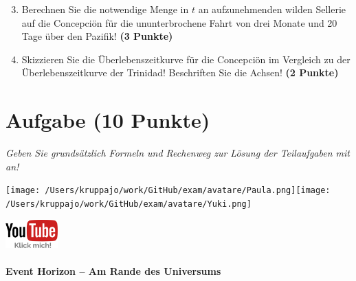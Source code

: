 \documentclass[a4paper, 9pt]{scrartcl}\usepackage[]{graphicx}\usepackage[]{xcolor}
\begin{document}
\begin{enumerate}
  \setcounter{enumi}{2}
\item Berechnen Sie die notwendige Menge in $t$ an aufzunehmenden wilden Sellerie auf die Concepciön für die ununterbrochene Fahrt von drei Monate und 20 Tage über den Pazifik! \textbf{(3 Punkte)}
\item Skizzieren Sie die Überlebenszeitkurve für die Concepciön im Vergleich zu der Überlebenszeitkurve der Trinidad! Beschriften Sie die Achsen! \textbf{(2 Punkte)}
\end{enumerate}

 
\clearpage

\section{Aufgabe \hfill (10 Punkte)}

\textit{Geben Sie grundsätzlich Formeln und Rechenweg zur Lösung der Teilaufgaben mit an!} \\[1Ex]
 

 
\begin{minipage}[t]{0.5\textwidth}
\texttt{[image: /Users/kruppajo/work/GitHub/exam/avatare/Paula.png]}\hspace{-4mm}\texttt{[image: /Users/kruppajo/work/GitHub/exam/avatare/Yuki.png]}
\end{minipage}
\begin{minipage}[t]{0.5\textwidth}
\hfill
\href{https://youtu.be/q-qYK4Chslg}{\includegraphics[width = 2cm]{img/youtube}}
\end{minipage}




\paragraph{Event Horizon -- Am Rande des Universums}
\end{document}
